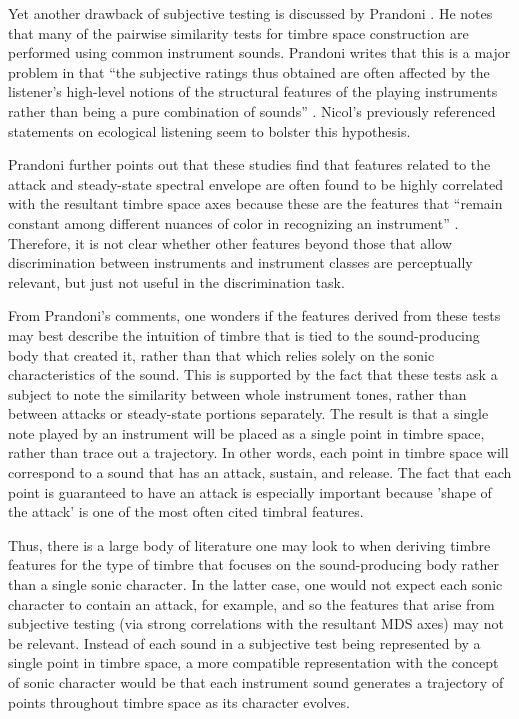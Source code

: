 \documentclass[12pt]{report} 	%
\numberwithin{figure}{chapter}
\numberwithin{table}{chapter}
\numberwithin{equation}{chapter}
\begin{document}
\begin{flushleft}
Yet another drawback of subjective testing is discussed by Prandoni \cite{Prandoni:1994th}. He notes that many of the pairwise similarity tests for timbre space construction are performed using common instrument sounds. Prandoni writes that this is a major problem in that ``the subjective ratings thus obtained are often affected by the listener's high-level notions of the structural features of the playing instruments rather than being a pure combination of sounds'' \cite[p. 2]{Prandoni:1994th}. Nicol's previously referenced statements on ecological listening seem to bolster this hypothesis. 

Prandoni further points out that these studies find that features related to the attack and steady-state spectral envelope are often found to be highly correlated with the resultant timbre space axes because these are the features that ``remain constant among different nuances of color in recognizing an instrument'' \cite[p. 8]{Prandoni:1994th}. Therefore, it is not clear whether other features beyond those that allow discrimination between instruments and instrument classes are perceptually relevant, but just not useful in the discrimination task. 

From Prandoni's comments, one wonders if the features derived from these tests may best describe the intuition of timbre that is tied to the sound-producing body that created it, rather than that which relies solely on the sonic characteristics of the sound. This is supported by the fact that these tests ask a subject to note the similarity between whole instrument tones, rather than between attacks or steady-state portions separately. The result is that a single note played by an instrument will be placed as a single point in timbre space, rather than trace out a trajectory. In other words, each point in timbre space will correspond to a sound that has an attack, sustain, and release. The fact that each point is guaranteed to have an attack is especially important because 'shape of the attack' is one of the most often cited timbral features.

Thus, there is a large body of literature one may look to when deriving timbre features for the type of timbre that focuses on the sound-producing body rather than a single sonic character. In the latter case, one would not expect each sonic character to contain an attack, for example, and so the features that arise from subjective testing (via strong correlations with the resultant MDS axes) may not be relevant. Instead of each sound in a subjective test being represented by a single point in timbre space, a more compatible representation with the concept of sonic character would be that each instrument sound generates a trajectory of points throughout timbre space as its character evolves. 


\end{flushleft}
\end{document}
